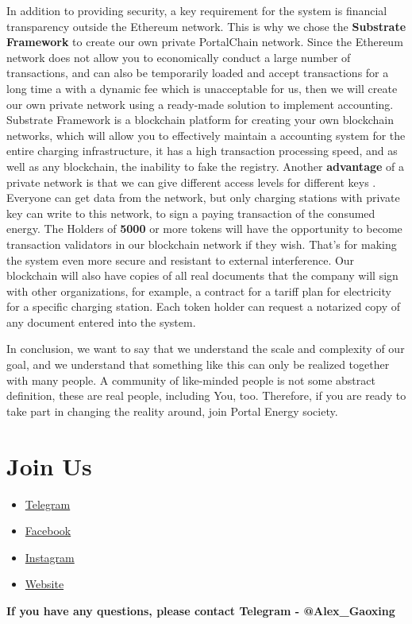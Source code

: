\documentclass[a4paper,12pt]{report}
\begin{document}
In addition to providing security, a key requirement for the system is financial transparency outside the Ethereum network. This is why we chose the \textbf{Substrate Framework} to create our own private PortalChain network.
Since the Ethereum network does not allow you to economically conduct a large number of transactions, and can also be temporarily loaded and accept transactions for a long time a with a dynamic fee which is  unacceptable for us, then we will create our own private network using a ready-made solution to implement accounting.
Substrate Framework is a blockchain platform for creating your own blockchain networks, which will allow you to effectively maintain a accounting system for the entire charging infrastructure, it has a high transaction processing speed, and as well as any blockchain, the inability to fake the registry.
Another \textbf{advantage} of a private network is that we can
give different access levels for different keys . Everyone can get data from the network, but only charging stations with private key can write to this network, to sign a  paying transaction of the consumed energy.
The Holders of \textbf{5000} or more tokens will have the opportunity to become transaction validators in our blockchain network if they wish. 
That's for making the system even more secure and resistant to external interference. Our blockchain will also have copies of all real documents that the company will sign with other organizations, for example, a contract for a tariff plan for electricity for a specific charging station. Each token holder can request a notarized copy of any document entered into the system.

In conclusion, we want to say that we understand the scale and complexity of our goal, and we understand that something like this can only be realized together with many people. A community of like-minded people is not some abstract definition, these are real people, including You, too. Therefore, if you are ready to take part in changing the reality around, join Portal Energy society.




\section{Join Us}

\begin{itemize}
	\item \href{https://t.me/Portal_Energy_Co}{Telegram}
	\item \href{https://www.facebook.com/portalenergyforeign}{Facebook}
	\item \href{https://www.instagram.com/portal_energy_company/}{Instagram}
	\item \href{https://portalenergy.tech/en}{Website}
\end{itemize}

\textbf{If you have any questions, please contact Telegram - @Alex\_Gaoxing}
\end{document}
